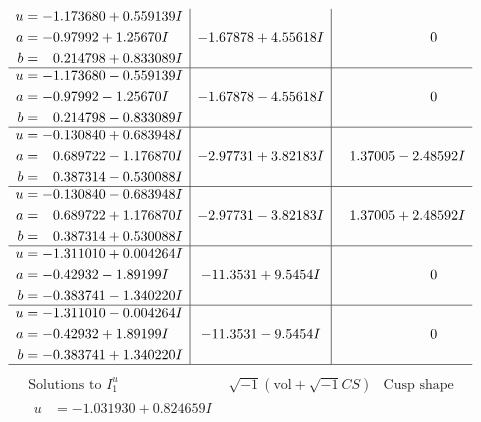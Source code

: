\documentclass[1p]{elsarticle_modified}
\theoremstyle{definition}
\newcommand{\I}{\sqrt{-1}}
\begin{document}
$$\begin{array}{c|c|c}
\begin{aligned}
u &= -1.173680 + 0.559139 I \\
a &= -0.97992 + 1.25670 I \\
b &= \phantom{-}0.214798 + 0.833089 I\end{aligned}
 & -1.67878 + 4.55618 I & \phantom{-0.000000 } 0 \\ \hline\begin{aligned}
u &= -1.173680 - 0.559139 I \\
a &= -0.97992 - 1.25670 I \\
b &= \phantom{-}0.214798 - 0.833089 I\end{aligned}
 & -1.67878 - 4.55618 I & \phantom{-0.000000 } 0 \\ \hline\begin{aligned}
u &= -0.130840 + 0.683948 I \\
a &= \phantom{-}0.689722 - 1.176870 I \\
b &= \phantom{-}0.387314 - 0.530088 I\end{aligned}
 & -2.97731 + 3.82183 I & \phantom{-}1.37005 - 2.48592 I \\ \hline\begin{aligned}
u &= -0.130840 - 0.683948 I \\
a &= \phantom{-}0.689722 + 1.176870 I \\
b &= \phantom{-}0.387314 + 0.530088 I\end{aligned}
 & -2.97731 - 3.82183 I & \phantom{-}1.37005 + 2.48592 I \\ \hline\begin{aligned}
u &= -1.311010 + 0.004264 I \\
a &= -0.42932 - 1.89199 I \\
b &= -0.383741 - 1.340220 I\end{aligned}
 & -11.3531 + 9.5454 I & \phantom{-0.000000 } 0 \\ \hline\begin{aligned}
u &= -1.311010 - 0.004264 I \\
a &= -0.42932 + 1.89199 I \\
b &= -0.383741 + 1.340220 I\end{aligned}
 & -11.3531 - 9.5454 I & \phantom{-0.000000 } 0\\
 \hline 
 \end{array}$$\newpage$$\begin{array}{c|c|c}  
\text{Solutions to }I^u_{1}& \I (\text{vol} + \sqrt{-1}CS) & \text{Cusp shape}\\
 \hline 
\begin{aligned}
u &= -1.031930 + 0.824659 I \\

\end{aligned}
\end{array}$$
\end{document}
